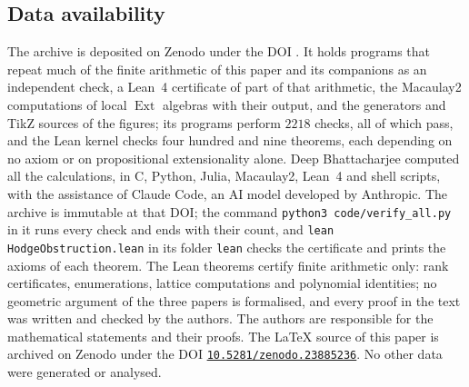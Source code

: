 \documentclass[11pt,reqno]{amsart}
\theoremstyle{plain}
\theoremstyle{definition}
\theoremstyle{remark}
\DeclareMathOperator{\Ext}{Ext}
\begin{document}
\subsection*{Data availability}
The archive \cite{BMB26} is deposited on Zenodo under the DOI
\zenodoCodeDOI. It holds programs that repeat much of the finite arithmetic of this paper and its companions \cite{paperI,paperIII}
as an independent check, a Lean~4 certificate of part of that arithmetic, the
Macaulay2 computations of local $\Ext$ algebras with their output, and the
generators and TikZ sources of the figures; its programs perform $2218$
checks, all of which pass, and the Lean kernel checks four hundred and nine
theorems, each depending on no axiom or on propositional extensionality
alone. Deep Bhattacharjee computed all the calculations, in C, Python, Julia,
Macaulay2, Lean~4 and shell scripts, with the assistance of Claude Code, an
AI model developed by Anthropic. The archive is immutable at that DOI;
the command \texttt{python3 code/verify\_all.py} in it runs every check and
ends with their count, and \texttt{lean HodgeObstruction.lean} in its folder
\texttt{lean} checks the certificate and prints the axioms of each theorem.
The Lean theorems certify finite arithmetic only: rank certificates,
enumerations, lattice computations and polynomial identities; no geometric
argument of the three papers is formalised, and every proof in the text was
written and checked by the authors. The authors are responsible for the
mathematical statements and their proofs. The \LaTeX{} source of this paper is
archived on Zenodo under the DOI \href{https://doi.org/10.5281/zenodo.23885236}{\texttt{10.5281/zenodo.23885236}}.
No other data were generated or analysed.
\end{document}
